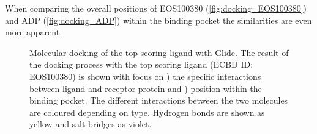 \documentclass[11pt, letterpaper, titlepage]{article}
\begin{document}
When comparing the overall positions of EOS100380 (\autoref{fig:docking_EOS100380}) and ADP (\autoref{fig:docking_ADP}) within the binding pocket the similarities are even more apparent. 

\begin{figure}[htp]
	\centering
	\captionsetup[subfigure]{skip=-20pt,position=top,labelfont=bf,labelformat=parens,singlelinecheck=false}
	\caption{Molecular docking of the top scoring ligand with Glide. The result of the docking process with the top scoring ligand (ECBD ID: EOS100380) is shown with focus on ) the specific interactions between ligand and receptor protein and ) position within the binding pocket. The different interactions between the two molecules are coloured depending on type. Hydrogen bonds are shown as yellow and salt bridges as violet.}\label{fig:docking_EOS100380}
\end{figure}
\end{document}
